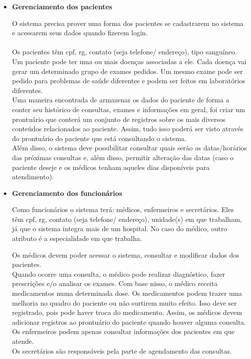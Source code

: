 \documentclass[12pt,a4paper]{report}
\begin{document}
\begin{itemize}
\item \textbf{Gerenciamento dos pacientes}

O sistema precisa prover uma forma dos pacientes se cadastrarem no sistema e acessarem seus dados quando fizerem login.\\
\\ Os pacientes têm cpf, rg, contato (seja telefone/ endereço), tipo sanguíneo.
Um paciente pode ter uma ou mais doenças associadas a ele. Cada doença vai gerar um determinado grupo de exames pedidos. Um mesmo exame pode ser pedido para problemas de saúde diferentes e podem ser feitos em laboratórios diferentes.\\
Uma maneira encontrada de armazenar os dados do paciente de forma a conter seu histórico de consultas, exames e informações em geral, foi criar um prontuário que conterá um conjunto de registros sobre os mais diversos conteúdos relacionados ao paciente. 
Assim, tudo isso poderá ser visto através do prontuário do paciente que está consultando o sistema. \\
Além disso, o sistema deve possibilitar consultar quais serão as datas/horários das próximas consultas e, além disso, permitir alteração das datas (caso o paciente deseje e os médicos tenham aqueles dias disponíveis para atendimento).

\item \textbf{Gerenciamento dos funcionários}

Como funcionários o sistema terá: médicos, enfermeiros e secretários.
Eles têm cpf, rg, contato (seja telefone/ endereço), unidade(s) em que trabalham, já que o sistema integra mais de um hospital.
No caso do médico, outro atributo é a especialidade em que trabalha.

Os médicos devem poder acessar o sistema, consultar e modificar dados dos pacientes. \\
Quando ocorre uma consulta, o médico pode realizar diagnóstico, fazer prescrições e/o analisar os exames. Com base nisso, o médico receita medicamentos numa determinada dose. Os medicamentos podem trazer uma melhoria no quadro do paciente ou não surtirem muito efeito. Isso deve ser registrado, pois pode haver troca do medicamento. Assim, os médicos devem adicionar registros ao prontuário do paciente quando houver alguma consulta. \\


Os enfermeiros podem apenas consultar informações dos pacientes em que atende. \\
Os secretários são responsáveis pela parte de agendamento das consultas.

\end{itemize}
\end{document}
